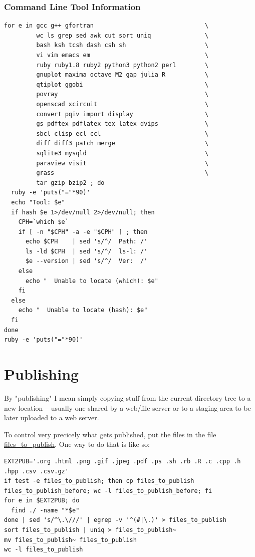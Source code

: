 \documentclass[11pt]{article}
\begin{document}
\subsubsection{Command Line Tool Information}
\label{sec-9-2-6}

\begin{verbatim}
for e in gcc g++ gfortran                               \
         wc ls grep sed awk cut sort uniq               \
         bash ksh tcsh dash csh sh                      \
         vi vim emacs em                                \
         ruby ruby1.8 ruby2 python3 python2 perl        \
         gnuplot maxima octave M2 gap julia R           \
         qtiplot ggobi                                  \
         povray                                         \
         openscad xcircuit                              \
         convert pqiv import display                    \
         gs pdftex pdflatex tex latex dvips             \
         sbcl clisp ecl ccl                             \
         diff diff3 patch merge                         \
         sqlite3 mysqld                                 \
         paraview visit                                 \
         grass                                          \
         tar gzip bzip2 ; do
  ruby -e 'puts("="*90)'
  echo "Tool: $e"
  if hash $e 1>/dev/null 2>/dev/null; then 
    CPH=`which $e`
    if [ -n "$CPH" -a -e "$CPH" ] ; then
      echo $CPH    | sed 's/^/  Path: /'
      ls -ld $CPH  | sed 's/^/  ls-l: /'
      $e --version | sed 's/^/  Ver:  /'
    else
      echo "  Unable to locate (which): $e"
    fi
  else
    echo "  Unable to locate (hash): $e"
  fi
done
ruby -e 'puts("="*90)'
\end{verbatim}


\section{Publishing}
\label{sec-10}

By "publishing" I mean simply copying stuff from the current directory tree to a new location -- usually one shared by a web/file server or to a staging area
to be later uploaded to a web server.

To control very precicely what gets published, put the files in the file \url{files_to_publish}.  One way to do that is like so:

\begin{verbatim}
EXT2PUB='.org .html .png .gif .jpeg .pdf .ps .sh .rb .R .c .cpp .h .hpp .csv .csv.gz'
if test -e files_to_publish; then cp files_to_publish files_to_publish_before; wc -l files_to_publish_before; fi
for e in $EXT2PUB; do
  find ./ -name "*$e"
done | sed 's/^\.\///' | egrep -v '^(#|\.)' > files_to_publish
sort files_to_publish | uniq > files_to_publish~
mv files_to_publish~ files_to_publish
wc -l files_to_publish
\end{verbatim}
\end{document}
